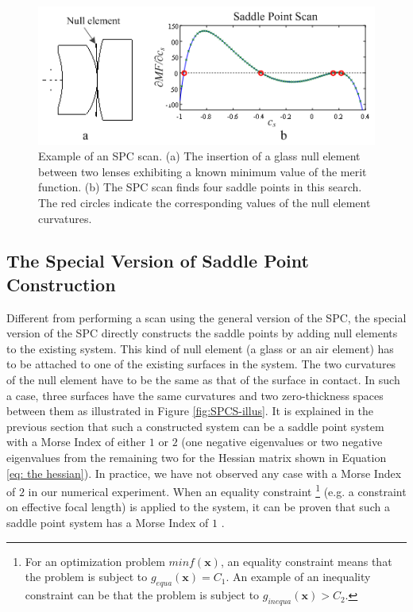 \begin{figure}[h!]
    \centering
    \includegraphics[scale=0.8]{chapter-2/figures/SPCscan.png}
    \caption{Example of an SPC scan. (a) The insertion of a glass null element between two lenses exhibiting a known minimum value of the merit function. (b) The SPC scan finds four saddle points in this search. The red circles indicate the corresponding values of the null element curvatures.}
    \label{fig:SPCscan}
\end{figure}

\subsection{The Special Version of Saddle Point Construction}
\label{SPC_Special}
Different from performing a scan using the general version of the SPC, the special version of the SPC directly constructs the saddle points by adding null elements to the existing system. This kind of null element (a glass or an air element) has to be attached to one of the existing surfaces in the system. The two curvatures of the null element have to be the same as that of the surface in contact. In such a case, three surfaces have the same curvatures and two zero-thickness spaces between them as illustrated in Figure \ref{fig:SPCS-illus}. It is explained in the previous section that such a constructed system can be a saddle point system with a Morse Index of either $1$ or $2$ (one negative eigenvalues or two negative eigenvalues from the remaining two for the Hessian matrix shown in Equation \ref{eq: the hessian}). In practice, we have not observed any case with a Morse Index of $2$ in our numerical experiment. When an equality constraint \footnote{For an optimization problem $min f(\mathbf{x})$, an equality constraint means that the problem is subject to $g_{equa}(\mathbf{x})=C_1$. An example of an inequality constraint can be that the problem is subject to $g_{inequa}(\mathbf{x}) > C_2$.} (e.g. a constraint on effective focal length) is applied to the system, it can be proven that such a saddle point system has a Morse Index of $1$ \cite{BociortSPCSexplained}.


